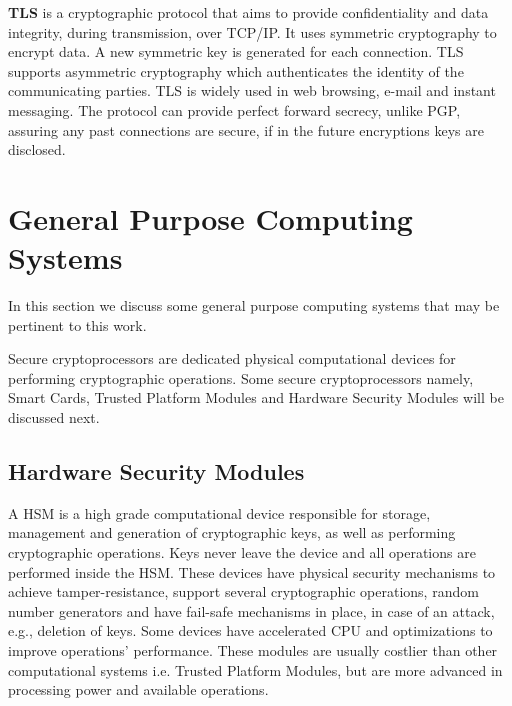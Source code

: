 \textbf{\ac{TLS}} is a cryptographic protocol that aims to provide confidentiality and data integrity, during transmission, over TCP/IP. It uses symmetric cryptography to encrypt data. A new symmetric key is generated for each connection.
\ac{TLS} supports asymmetric cryptography which authenticates the identity of the communicating parties.
\ac{TLS} is widely used in web browsing, e-mail and instant messaging.
The protocol can provide perfect forward secrecy, unlike \ac{PGP}, assuring any past connections are secure, if in the future encryptions keys are disclosed.


\section{General Purpose Computing Systems}\label{chap:background:computing}

In this section we discuss some general purpose computing systems that may be pertinent to this work. 

Secure cryptoprocessors are dedicated physical computational devices for performing cryptographic operations. Some secure cryptoprocessors namely, Smart Cards, Trusted Platform Modules and Hardware Security Modules will be discussed next.

\subsection{Hardware Security Modules}\label{chap:background:computing:hsm}

A \ac{HSM} is a high grade computational device responsible for storage, management and generation of cryptographic keys, as well as performing cryptographic operations. Keys never leave the device and all operations are performed inside the \ac{HSM}. These devices have physical security mechanisms to achieve tamper-resistance, support several cryptographic operations, random number generators and have fail-safe mechanisms in place, in case of an attack, e.g., deletion of keys. Some devices have accelerated \ac{CPU} and optimizations to improve operations' performance.
These modules are usually costlier than other computational systems i.e. Trusted Platform Modules, but are more advanced in processing power and available operations.

